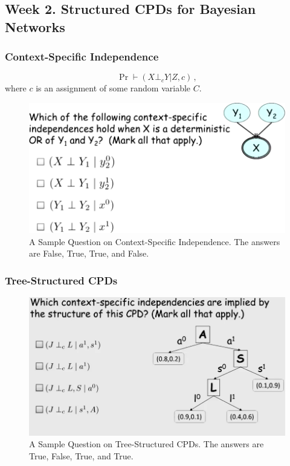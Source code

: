 \documentclass[12pt]{article}
\begin{document}
\subsection{Week 2. Structured CPDs for Bayesian Networks}

\subsubsection{Context-Specific Independence}
\begin{equation*}
  \Pr \vdash (X \bot_c Y | Z, c) \, ,
\end{equation*}
where $c$ is an assignment of some random variable $C$.

\begin{figure}[H]
\centering
\includegraphics[width=6.5in]{graphics/example_context_specific_independence.png}
\caption{A Sample Question on Context-Specific Independence.  The answers are False, True, True, and False.}
\label{fig:example_context_specific_independence}
\end{figure}

\subsubsection{Tree-Structured CPDs}

\begin{figure}[H]
\centering
\includegraphics[width=6.5in]{graphics/example_tree_structured_cpds.png}
\caption{A Sample Question on Tree-Structured CPDs.  The answers are True, False, True, and True.}
\label{fig:example_tree_structured_cpds}
\end{figure}
\end{document}
